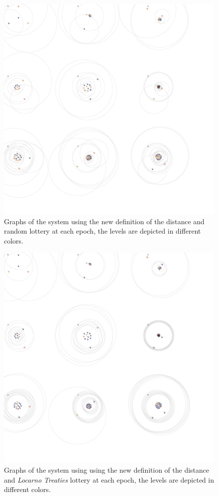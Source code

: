 \documentclass[a4paper,11pt,twoside,openright]{report}
\begin{document}
\begin{figure}[!h] 
\centering
\includegraphics[width=350pt]{figures/SpaceTime-Random}
\caption{Graphs of the system using the new definition of the distance and random lottery at each epoch, the levels are depicted in different colors.}
\label{fig:SpaceTime-Random}
\end{figure}

\begin{figure}[!h] 
\centering
\includegraphics[width=500pt]{figures/SpaceTime-Locarno}
\caption{Graphs of the system using  using the new definition of the distance and \textit{Locarno Treaties} lottery at each epoch, the levels are depicted in different colors.}
  \label{fig:SpaceTime-Locarno}
\end{figure}
\end{document}
